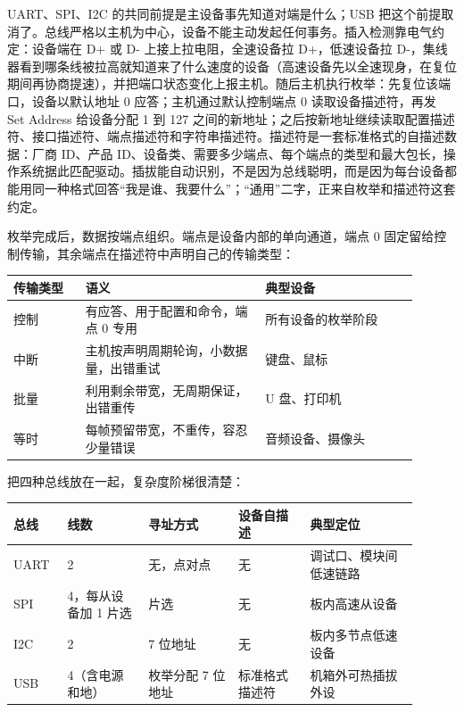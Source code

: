 UART、SPI、I2C 的共同前提是主设备事先知道对端是什么；USB 把这个前提取消了。总线严格以主机为中心，设备不能主动发起任何事务。插入检测靠电气约定：设备端在 D+ 或 D- 上接上拉电阻，全速设备拉 D+，低速设备拉 D-，集线器看到哪条线被拉高就知道来了什么速度的设备（高速设备先以全速现身，在复位期间再协商提速），并把端口状态变化上报主机。随后主机执行枚举：先复位该端口，设备以默认地址 0 应答；主机通过默认控制端点 0 读取设备描述符，再发 Set Address 给设备分配 1 到 127 之间的新地址；之后按新地址继续读取配置描述符、接口描述符、端点描述符和字符串描述符。描述符是一套标准格式的自描述数据：厂商 ID、产品 ID、设备类、需要多少端点、每个端点的类型和最大包长，操作系统据此匹配驱动。插拔能自动识别，不是因为总线聪明，而是因为每台设备都能用同一种格式回答“我是谁、我要什么”；“通用”二字，正来自枚举和描述符这套约定。

枚举完成后，数据按端点组织。端点是设备内部的单向通道，端点 0 固定留给控制传输，其余端点在描述符中声明自己的传输类型：

\begin{longtable}{L{0.16\linewidth}L{0.40\linewidth}L{0.34\linewidth}}
\toprule
传输类型 & 语义 & 典型设备 \\
\midrule
控制 & 有应答、用于配置和命令，端点 0 专用 & 所有设备的枚举阶段 \\
中断 & 主机按声明周期轮询，小数据量，出错重试 & 键盘、鼠标 \\
批量 & 利用剩余带宽，无周期保证，出错重传 & U 盘、打印机 \\
等时 & 每帧预留带宽，不重传，容忍少量错误 & 音频设备、摄像头 \\
\bottomrule
\end{longtable}

把四种总线放在一起，复杂度阶梯很清楚：

\begin{longtable}{L{0.12\linewidth}L{0.18\linewidth}L{0.20\linewidth}L{0.16\linewidth}L{0.24\linewidth}}
\toprule
总线 & 线数 & 寻址方式 & 设备自描述 & 典型定位 \\
\midrule
UART & 2 & 无，点对点 & 无 & 调试口、模块间低速链路 \\
SPI & 4，每从设备加 1 片选 & 片选 & 无 & 板内高速从设备 \\
I2C & 2 & 7 位地址 & 无 & 板内多节点低速设备 \\
USB & 4（含电源和地） & 枚举分配 7 位地址 & 标准格式描述符 & 机箱外可热插拔外设 \\
\bottomrule
\end{longtable}

